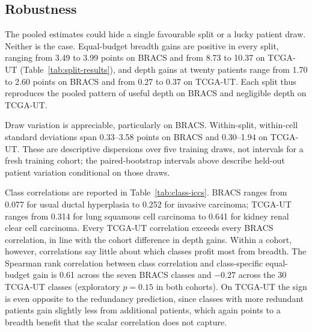 \subsection{Robustness}
\label{sec:robustness}
The pooled estimates could hide a single favourable split or a lucky patient draw. Neither is the case. Equal-budget breadth gains are positive in every split, ranging from 3.49 to 3.99 points on BRACS and from 8.73 to 10.37 on TCGA-UT (Table~\ref{tab:split-results}), and depth gains at twenty patients range from 1.70 to 2.60 points on BRACS and from 0.27 to 0.37 on TCGA-UT. Each split thus reproduces the pooled pattern of useful depth on BRACS and negligible depth on TCGA-UT.

\begin{table}[htbp]
\centering\small

\caption{Every split favours breadth at the equal budget and reproduces the cohort difference in depth gains. Contrasts are in points and average five draws per cell. Draw SD is computed within each split and cell with divisor five, and the displayed range spans the nine cells. Splits overlap and are not independent cohort replications.}
\label{tab:split-results}
\end{table}

\noindent Draw variation is appreciable, particularly on BRACS. Within-split, within-cell standard deviations span 0.33--3.58 points on BRACS and 0.30--1.94 on TCGA-UT. These are descriptive dispersions over five training draws, not intervals for a fresh training cohort; the paired-bootstrap intervals above describe held-out patient variation conditional on those draws.

Class correlations are reported in Table~\ref{tab:class-iccs}. BRACS ranges from 0.077 for usual ductal hyperplasia to 0.252 for invasive carcinoma; TCGA-UT ranges from 0.314 for lung squamous cell carcinoma to 0.641 for kidney renal clear cell carcinoma. Every TCGA-UT correlation exceeds every BRACS correlation, in line with the cohort difference in depth gains. Within a cohort, however, correlations say little about which classes profit most from breadth. The Spearman rank correlation between class correlation and class-specific equal-budget gain is 0.61 across the seven BRACS classes and $-0.27$ across the 30 TCGA-UT classes (exploratory $p=0.15$ in both cohorts). On TCGA-UT the sign is even opposite to the redundancy prediction, since classes with more redundant patients gain slightly less from additional patients, which again points to a breadth benefit that the scalar correlation does not capture.

